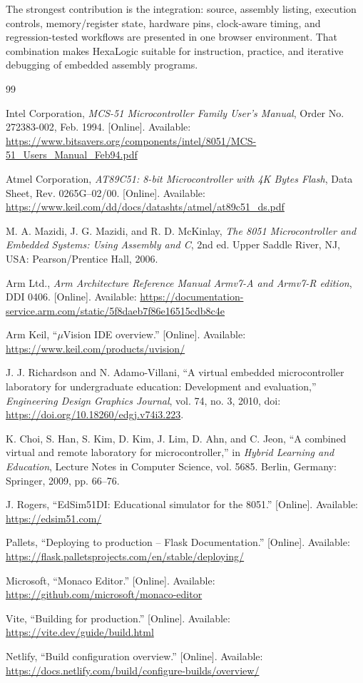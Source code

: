 \documentclass[conference]{IEEEtran}
\begin{document}
The strongest contribution is the integration: source, assembly listing, execution controls, memory/register state, hardware pins, clock-aware timing, and regression-tested workflows are presented in one browser environment. That combination makes HexaLogic suitable for instruction, practice, and iterative debugging of embedded assembly programs.

\begin{thebibliography}{99}

Intel Corporation,
\emph{MCS-51 Microcontroller Family User's Manual},
Order No. 272383-002, Feb. 1994. [Online].
Available: \url{https://www.bitsavers.org/components/intel/8051/MCS-51_Users_Manual_Feb94.pdf}

Atmel Corporation,
\emph{AT89C51: 8-bit Microcontroller with 4K Bytes Flash},
Data Sheet, Rev. 0265G--02/00. [Online].
Available: \url{https://www.keil.com/dd/docs/datashts/atmel/at89c51_ds.pdf}

M. A. Mazidi, J. G. Mazidi, and R. D. McKinlay,
\emph{The 8051 Microcontroller and Embedded Systems: Using Assembly and C},
2nd ed. Upper Saddle River, NJ, USA: Pearson/Prentice Hall, 2006.

Arm Ltd.,
\emph{Arm Architecture Reference Manual Armv7-A and Armv7-R edition},
DDI 0406. [Online].
Available: \url{https://documentation-service.arm.com/static/5f8daeb7f86e16515cdb8c4e}

Arm Keil,
``\(\mu\)Vision IDE overview.'' [Online].
Available: \url{https://www.keil.com/products/uvision/}

J. J. Richardson and N. Adamo-Villani,
``A virtual embedded microcontroller laboratory for undergraduate education: Development and evaluation,''
\emph{Engineering Design Graphics Journal},
vol. 74, no. 3, 2010,
doi: \url{https://doi.org/10.18260/edgj.v74i3.223}.

K. Choi, S. Han, S. Kim, D. Kim, J. Lim, D. Ahn, and C. Jeon,
``A combined virtual and remote laboratory for microcontroller,''
in \emph{Hybrid Learning and Education}, Lecture Notes in Computer Science, vol. 5685.
Berlin, Germany: Springer, 2009, pp. 66--76.

J. Rogers,
``EdSim51DI: Educational simulator for the 8051.'' [Online].
Available: \url{https://edsim51.com/}

Pallets,
``Deploying to production -- Flask Documentation.'' [Online].
Available: \url{https://flask.palletsprojects.com/en/stable/deploying/}

Microsoft,
``Monaco Editor.'' [Online].
Available: \url{https://github.com/microsoft/monaco-editor}

Vite,
``Building for production.'' [Online].
Available: \url{https://vite.dev/guide/build.html}

Netlify,
``Build configuration overview.'' [Online].
Available: \url{https://docs.netlify.com/build/configure-builds/overview/}

\end{thebibliography}
\end{document}
